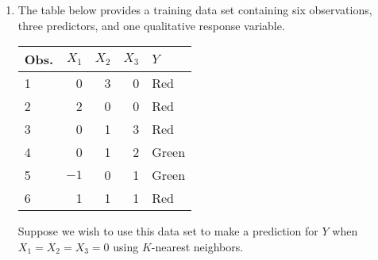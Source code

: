 \documentclass[11pt]{article}
\begin{document}
\begin{enumerate}
  \item The table below provides a training data set containing six
    observations, three predictors, and one qualitative response variable.
    \begin{center}
      \begin{tabular}{l|rrrl}
        \hline
        Obs. & $X_1$ & $X_2$ & $X_3$ & $Y$ \\
        \hline
        1 & 0 & 3 & 0 & Red \\
        2 & 2 & 0 & 0 & Red \\
        3 & 0 & 1 & 3 & Red \\
        4 & 0 & 1 & 2 & Green \\
        5 & $-1$ & 0 & 1 & Green \\
        6 & 1 & 1 & 1 & Red \\
        \hline
      \end{tabular}
    \end{center}

    Suppose we wish to use this data set to make a prediction for $Y$
    when $X_1 = X_2 = X_3 = 0$ using $K$-nearest neighbors.


\end{enumerate}
\end{document}
